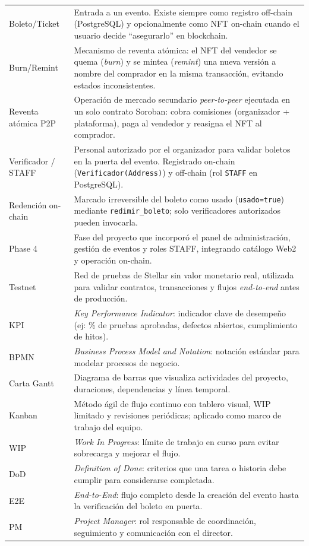 \documentclass[12pt,oneside]{report}
\begin{document}
\begin{longtable}{@{}p{3.8cm} p{10.7cm}@{}}
      Boleto/Ticket & Entrada a un evento. Existe siempre como registro off-chain (PostgreSQL) y opcionalmente como NFT on-chain cuando el usuario decide ``asegurarlo'' en blockchain.\\
      Burn/Remint & Mecanismo de reventa atómica: el NFT del vendedor se quema (\textit{burn}) y se mintea (\textit{remint}) una nueva versión a nombre del comprador en la misma transacción, evitando estados inconsistentes.\\
      Reventa atómica P2P & Operación de mercado secundario \textit{peer-to-peer} ejecutada en un solo contrato Soroban: cobra comisiones (organizador + plataforma), paga al vendedor y reasigna el NFT al comprador.\\
      Verificador / STAFF & Personal autorizado por el organizador para validar boletos en la puerta del evento. Registrado on-chain (\texttt{Verificador(Address)}) y off-chain (rol \texttt{STAFF} en PostgreSQL).\\
      Redención on-chain & Marcado irreversible del boleto como usado (\texttt{usado=true}) mediante \texttt{redimir\_boleto}; solo verificadores autorizados pueden invocarla.\\
      Phase 4 & Fase del proyecto que incorporó el panel de administración, gestión de eventos y roles STAFF, integrando catálogo Web2 y operación on-chain.\\
      Testnet & Red de pruebas de Stellar sin valor monetario real, utilizada para validar contratos, transacciones y flujos \textit{end-to-end} antes de producción.\\
      KPI & \textit{Key Performance Indicator}: indicador clave de desempeño (ej: \% de pruebas aprobadas, defectos abiertos, cumplimiento de hitos).\\
      BPMN & \textit{Business Process Model and Notation}: notación estándar para modelar procesos de negocio.\\
      Carta Gantt & Diagrama de barras que visualiza actividades del proyecto, duraciones, dependencias y línea temporal.\\
      Kanban & Método ágil de flujo continuo con tablero visual, WIP limitado y revisiones periódicas; aplicado como marco de trabajo del equipo.\\
      WIP & \textit{Work In Progress}: límite de trabajo en curso para evitar sobrecarga y mejorar el flujo.\\
      DoD & \textit{Definition of Done}: criterios que una tarea o historia debe cumplir para considerarse completada.\\
      E2E & \textit{End-to-End}: flujo completo desde la creación del evento hasta la verificación del boleto en puerta.\\
      PM & \textit{Project Manager}: rol responsable de coordinación, seguimiento y comunicación con el director.\\
      \bottomrule
    \end{longtable}
\end{document}
